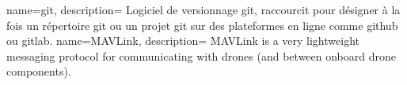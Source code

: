

{
    name={git},
    description={
    Logiciel de versionnage git, raccourcit pour désigner à la fois un répertoire git ou un projet git sur des plateformes en ligne comme github ou gitlab.
    }
}
{
    name={MAVLink},
    description={
        MAVLink is a very lightweight messaging protocol for communicating with drones (and between onboard drone components).
    }
}

